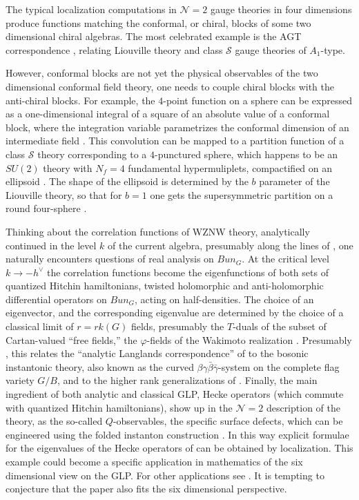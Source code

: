 \documentclass[12pt]{article}
\newcommand\CalN{\mathcal{N}}
\newcommand\CalS{\mathcal{S}}
\begin{document}
{}The typical localization computations in ${\CalN}=2$ gauge theories in four dimensions produce functions matching the conformal, or chiral, blocks of some two dimensional chiral algebras. The most celebrated example is the AGT correspondence
\cite{Alday:2009aq}, relating Liouville theory and class $\CalS$
gauge theories of $A_1$-type. 

However, conformal blocks are not yet the physical observables
of the two dimensional conformal field theory, one needs to couple chiral blocks with the anti-chiral blocks. For example, 
the $4$-point function on a sphere can be expressed as a one-dimensional integral of a square of an absolute value of a conformal block, where the integration variable parametrizes the
conformal dimension of an intermediate field \cite{Zamolodchikov:1995aa}. This convolution can be mapped
to a partition function of a class ${\CalS}$ theory corresponding to a $4$-punctured sphere, which happens to be an $SU(2)$ theory with $N_f = 4$ fundamental hypermuliplets, compactified on an ellipsoid \cite{Hama:2012bg}. 
The shape of the ellipsoid is determined by the $b$ parameter
of the Liouville theory, so that for $b =1$ one gets the supersymmetric partition on a round four-sphere \cite{Pestun:2007rz}. 


Thinking about the correlation functions of WZNW theory, 
analytically continued in the level $k$ of the current algebra, presumably along the lines of \cite{Witten:2010cx}, one naturally
encounters questions of real analysis on $Bun_G$. At the critical level $k \to - h^{\vee}$ the correlation functions become the eigenfunctions of both sets of quantized Hitchin hamiltonians, twisted holomorphic and anti-holomorphic differential operators on $Bun_G$, acting on half-densities. The choice of an eigenvector, and the corresponding eigenvalue are determined by the choice of a classical limit of $r = rk (G)$ fields, presumably the $T$-duals of the subset of Cartan-valued ``free fields,'' the $\varphi$-fields of the Wakimoto realization \cite{Wakimoto:1986gf, FF1,Gerasimov:1989ng}.
Presumably \cite{Frenkel:2022}, this relates the ``analytic Langlands correspondence'' of \cite{Etingof:2019pni,Etingof:2021eeu, Gaiotto:2021tsq} to 
the bosonic instantonic theory, also known as the curved $\beta\gamma{\bar \beta}{\bar\gamma}$-system  \cite{Nekrasov:2005wg,Losev:2005pu,Frenkel:2006fy,
Frenkel:2008vz} on the complete flag variety $G/B$, and to the higher rank generalizations of \cite{Ribault:2005wp,Hikida:2007tq,Teschner:2017djr}. Finally, 
the main ingredient of both analytic and classical GLP, 
Hecke operators \cite{Etingof:2021eub} (which commute with quantized Hitchin hamiltonians), show up in the ${\CalN}=2$ description of the
theory, as the so-called $Q$-observables, the specific surface defects, which can be engineered using the folded instanton construction \cite{Jeong:2021rll, Jeong:2022}. In this way 
explicit formulae for the eigenvalues of the Hecke operators
of \cite{Etingof:2019pni, Etingof:2021eub} can be obtained by localization. This example could become a specific application in mathematics
of the six dimensional view on the GLP. For other applications see \cite{Frenkel:2007tx}. 
It is tempting to conjecture that the paper \cite{GinzburgKapranovVasserot} also fits the six dimensional perspective. 
\end{document}
